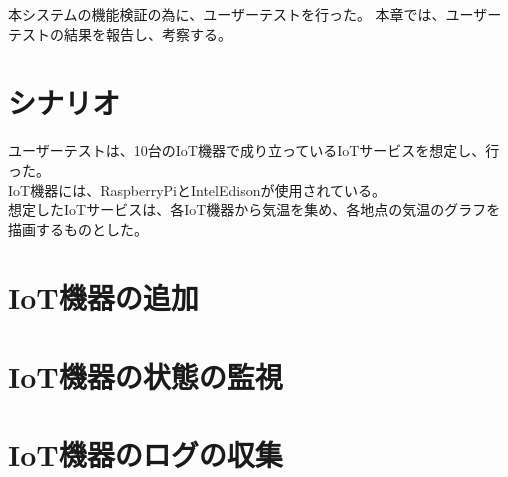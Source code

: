 本システムの機能検証の為に、ユーザーテストを行った。
本章では、ユーザーテストの結果を報告し、考察する。

\section{シナリオ}
ユーザーテストは、10台のIoT機器で成り立っているIoTサービスを想定し、行った。\\
IoT機器には、RaspberryPiとIntelEdisonが使用されている。\\
想定したIoTサービスは、各IoT機器から気温を集め、各地点の気温のグラフを描画するものとした。

\section{IoT機器の追加}

\section{IoT機器の状態の監視}

\section{IoT機器のログの収集}




